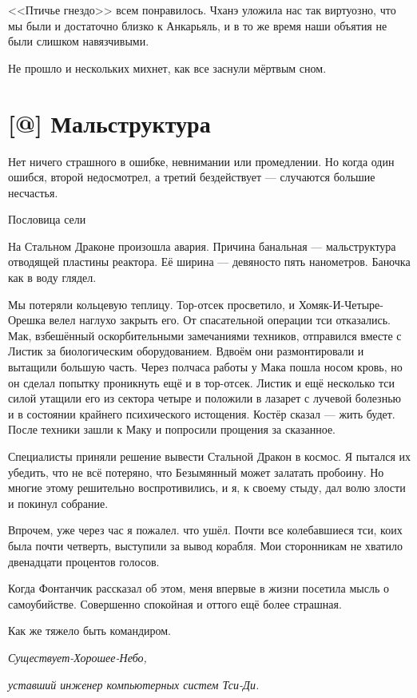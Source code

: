 <<Птичье гнездо>> всем понравилось.
Чханэ уложила нас так виртуозно, что мы были и достаточно близко к Анкарьяль, и в то же время наши объятия не были слишком навязчивыми.

Не прошло и нескольких михнет, как все заснули мёртвым сном.

\section{[@] Мальструктура}

\epigraph
{Нет ничего страшного в ошибке, невнимании или промедлении.
Но когда один ошибся, второй недосмотрел, а третий бездействует --- случаются большие несчастья.}
{Пословица сели}

На Стальном Драконе произошла авария.
Причина банальная --- мальструктура отводящей пластины реактора\FM.
Её ширина --- девяносто пять нанометров.
Баночка как в воду глядел.

Мы потеряли кольцевую теплицу.
Тор-отсек просветило, и Хомяк-И-Четыре-Орешка велел наглухо закрыть его.
От спасательной операции тси отказались.
Мак, взбешённый оскорбительными замечаниями техников, отправился вместе с Листик за биологическим оборудованием.
Вдвоём они размонтировали и вытащили большую часть.
Через полчаса работы у Мака пошла носом кровь, но он сделал попытку проникнуть ещё и в тор-отсек.
Листик и ещё несколько тси силой утащили его из сектора четыре и положили в лазарет с лучевой болезнью и в состоянии крайнего психического истощения.
Костёр сказал --- жить будет.
После техники зашли к Маку и попросили прощения за сказанное.

Специалисты приняли решение вывести Стальной Дракон в космос.
Я пытался их убедить, что не всё потеряно, что Безымянный может залатать пробоину.
Но многие этому решительно воспротивились, и я, к своему стыду, дал волю злости и покинул собрание.

Впрочем, уже через час я пожалел. что ушёл.
Почти все колебавшиеся тси, коих была почти четверть, выступили за вывод корабля.
Мои сторонникам не хватило двенадцати процентов голосов.

Когда Фонтанчик рассказал об этом, меня впервые в жизни посетила мысль о самоубийстве.
Совершенно спокойная и оттого ещё более страшная.

Как же тяжело быть командиром.

\emph{Существует-Хорошее-Небо,}

\emph{уставший инженер компьютерных систем Тси-Ди.}

